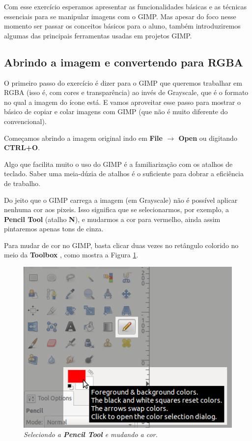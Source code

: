 \documentclass[12pt,onecolumn]{article}
\begin{document}
  Com esse exercício esperamos apresentar as funcionalidades básicas e as
  técnicas essenciais para se manipular imagens com o GIMP. Mas apesar do foco
  nesse momento ser passar os conceitos básicos para o aluno, também
  introduziremos algumas das principais ferramentas usadas em projetos GIMP.
  
  \subsection{Abrindo a imagem e convertendo para RGBA}
    O primeiro passo do exercício é dizer para o GIMP que queremos trabalhar em
    RGBA (isso é, com cores e transparência) ao invés de Grayscale, que é o
    formato no qual a imagem do ícone está. E vamos aproveitar esse passo para
    mostrar o básico de copiar e colar imagens com GIMP (que não é muito
    diferente do convencional).
    
    Começamos abrindo a imagem original indo em {\bf File $\rightarrow$ Open}
    ou digitando {\bf CTRL+O}.
    
    \begin{framed}
      Algo que facilita muito o uso do GIMP é a familiarização com os atalhos
      de teclado. Saber uma meia-dúzia de atalhos é o suficiente para dobrar a
      eficiência de trabalho. 
    \end{framed}
    
    Do jeito que o GIMP carrega a imagem (em Grayscale) não é possível aplicar
    nenhuma cor aos pixeis. Isso significa que se selecionarmos, por exemplo,
    a {\bf Pencil Tool} (atalho {\bf N}), e mudarmos a cor para vermelho, ainda
    assim pintaremos apenas tons de cinza.
    
    \begin{framed}
      Para mudar de cor no GIMP, basta clicar duas vezes no retângulo colorido
      no meio da {\bf Toolbox }, como mostra a Figura \ref{fig:pencil_and_color}.
    \end{framed}
    
    \begin{figure}[ht]
      \centering
      \includegraphics[width=.6\textwidth]{screenshots/00-pencil_and_color.png}
      \caption{
        \footnotesize
        \it
        Seleciondo a {\bf Pencil Tool} e mudando a cor.
      }
      \label{fig:pencil_and_color}
    \end{figure}
    
\end{document}
